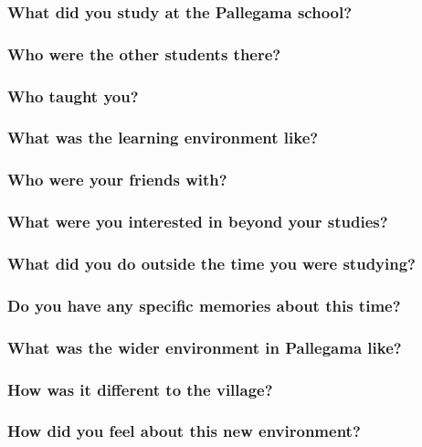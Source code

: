 \documentclass[11pt]{article}
\begin{document}
\subsubsection{What did you study at the Pallegama school?}
\label{sec:orgb8eea26}
\subsubsection{Who were the other students there?}
\label{sec:orgaced4e3}
\subsubsection{Who taught you?}
\label{sec:org5e21090}
\subsubsection{What was the learning environment like?}
\label{sec:org8b059ea}
\subsubsection{Who were your friends with?}
\label{sec:org76f672d}
\subsubsection{What were you interested in beyond your studies?}
\label{sec:org1ff9f60}
\subsubsection{What did you do outside the time you were studying?}
\label{sec:org9d51f23}
\subsubsection{Do you have any specific memories about this time?}
\label{sec:org2a91df9}
\subsubsection{What was the wider environment in Pallegama like?}
\label{sec:orge58cf03}
\subsubsection{How was it different to the village?}
\label{sec:orgb0ec5be}
\subsubsection{How did you feel about this new environment?}
\label{sec:orgfc8ac71}
\end{document}
